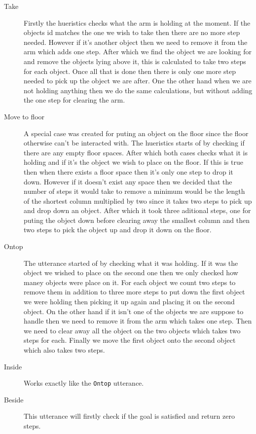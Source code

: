\begin{description}
  \item[Take] Firstly the hueristics checks what the arm is holding at the moment.
    If the objects id matches the one we wish to take then there are no more step needed.
    However if it's another object then we need to remove it from the arm which adds one step.
    After which we find the object we are looking for and remove the objects lying above it, this is calculated to take two steps for each object.
    Once all that is done then there is only one more step needed to pick up the object we are after.
    One the other hand when we are not holding anything then we do the same calculations, but without adding the one step for clearing the arm.
  \item[Move to floor] A special case was created for puting an object on the floor since the floor otherwise can't be interacted with.
    The hueristics starts of by checking if there are any empty floor spaces.
    After which both cases checks what it is holding and if it's the object we wish to place on the floor.
    If this is true then when there exists a floor space then it's only one step to drop it down.
    However if it doesn't exist any space then we decided that the number of steps it would take to remove a minimum would be the length of the shortest column multiplied by two since it takes two steps to pick up and drop down an object.
    After which it took three aditional steps, one for puting the object down before clearing away the smallest column and then two steps to pick the object up and drop it down on the floor.
  \item[Ontop] The utterance started of by checking what it was holding.
    If it was the object we wished to place on the second one then we only checked how maney objects were place on it. 
    For each object we count two steps to remove them in addition to three more steps to put down the first object we were holding then picking it up again and placing it on the second object.
    On the other hand if it isn't one of the objects we are suppose to handle then we need to remove it from the arm which takes one step.
    Then we need to clear away all the object on the two objects which takes two steps for each.
    Finally we move the first object onto the second object which also takes two steps.
  \item[Inside] Works exactly like the \verb|Ontop| utterance.
  \item[Beside] This utterance will firstly check if the goal is satisfied and return zero steps.

\end{description}
